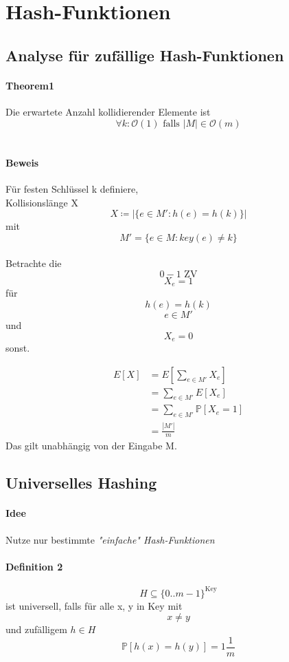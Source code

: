 \documentclass[a4paper]{scrartcl}
\begin{document}
	\section{Hash-Funktionen}
		\subsection{Analyse für zufällige Hash-Funktionen}
	 	\paragraph{Theorem1}
	 	Die erwartete Anzahl kollidierender Elemente ist \[ \forall k : \mathcal{O}(1) \text{ falls } |M| \in \mathcal{O}(m) \]\\
	 	
	 	\paragraph{Beweis}
	 	Für festen Schlüssel k definiere,\\ 
	 	Kollisionslänge X \[ X \coloneqq | \{ e \in M' : h(e) = h(k) \} | \] mit \[ M' = \{ e \in M : key (e) \neq k \} \]\\
	 	Betrachte die \[0-1 \text{ ZV}\] 
	 	\[X_e = 1\] für \[ h(e) = h(k) \] \[e \in M' \] und  \[X_e = 0\]  sonst. 
	 	
	 	\begin{align*}
	 		E[X] &= E[\sum_{e \in M'} X_e] \\
	 		&= \sum_{e \in M'}E[X_e] \\
	 		&= \sum_{e \in M'}\mathbb{P} [X_e = 1]\\ 
	 		&= \frac{|M'|}{m}
	 	\end{align*}
	 	Das gilt unabhängig von der Eingabe M.
	 	
	 	\subsection{Universelles Hashing}
	 	\paragraph{Idee}
	 	Nutze nur bestimmte \emph{"einfache" Hash-Funktionen}\\
	 	
	 	\paragraph{Definition 2}
	 	\[ H \subseteq \{0.. m - 1 \}^{\text{Key}} \] ist universell,
	 	falls für alle x, y in Key mit \[ x \neq y \]
	 	und zufälligem \(h \in H \)
	 	\[ \mathbb{P} [h(x) = h(y)] = 1 \frac{1}{m} \]
	 	
\end{document}
